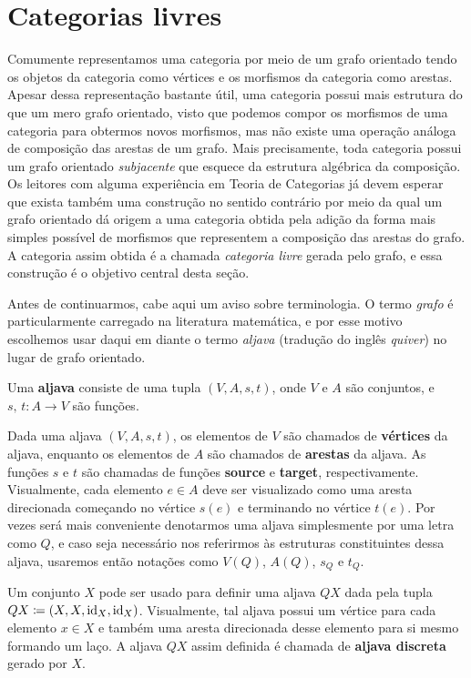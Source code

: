 \section{Categorias livres}

Comumente representamos uma categoria por meio de um grafo orientado tendo os objetos da categoria como vértices e os morfismos da categoria como arestas.
Apesar dessa representação bastante útil, uma categoria possui mais estrutura do que um mero grafo orientado, visto que podemos compor os morfismos de uma categoria para obtermos novos morfismos, mas não existe uma operação análoga de composição das arestas de um grafo.
Mais precisamente, toda categoria possui um grafo orientado \emph{subjacente} que esquece da estrutura algébrica da composição.
Os leitores com alguma experiência em Teoria de Categorias já devem esperar que exista também uma construção no sentido contrário por meio da qual um grafo orientado dá origem a uma categoria obtida pela adição da forma mais simples possível de morfismos que representem a composição das arestas do grafo.
A categoria assim obtida é a chamada \emph{categoria livre} gerada pelo grafo, e essa construção é o objetivo central desta seção.

Antes de continuarmos, cabe aqui um aviso sobre terminologia.
O termo \emph{grafo} é particularmente carregado na literatura matemática, e por esse motivo escolhemos usar daqui em diante o termo \emph{aljava} (tradução do inglês \emph{quiver}) no lugar de grafo orientado.

\begin{defin}\label{defin:aljava}
    Uma \textbf{aljava} consiste de uma tupla $(V,A,s,t)$, onde $V$ e $A$ são conjuntos, e $s,\,t: A \to V$ são funções.
\end{defin}

Dada uma aljava $(V,A,s,t)$, os elementos de $V$ são chamados de \textbf{vértices} da aljava, enquanto os elementos de $A$ são chamados de \textbf{arestas} da aljava.
As funções $s$ e $t$ são chamadas de funções \textbf{source} e \textbf{target}, respectivamente.
Visualmente, cada elemento $e \in A$ deve ser visualizado como uma aresta direcionada começando no vértice $s(e)$ e terminando no vértice $t(e)$.
Por vezes será mais conveniente denotarmos uma aljava simplesmente por uma letra como $Q$, e caso seja necessário nos referirmos às estruturas constituintes dessa aljava, usaremos então notações como $V(Q)$, $A(Q)$, $s_Q$ e $t_Q$.

\begin{exem}\label{exem:aljava_discreta}
    Um conjunto $X$ pode ser usado para definir uma aljava $QX$ dada pela tupla $QX \coloneqq (X,X,\mathrm{id}_X,\mathrm{id}_X)$.
    Visualmente, tal aljava possui um vértice para cada elemento $x \in X$ e também uma aresta direcionada desse elemento para si mesmo formando um laço.
    A aljava $QX$ assim definida é chamada de \textbf{aljava discreta} gerado por $X$.
\end{exem}

